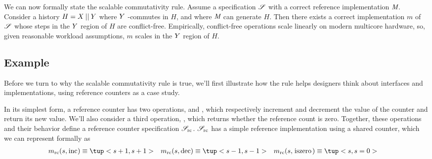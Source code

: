 We can now formally state the scalable commutativity rule.
%
Assume a specification $\mathscr{S}$ with a correct reference implementation
$\textit{M}$.
%
Consider a history $H = X \mathbin{||} Y$ where $Y$ \SIM-commutes in $H$,
and where $\textit{M}$ can generate $H$.
%
Then there exists a correct implementation $m$ of $\mathscr{S}$ whose steps in
the $Y$ region of $H$ are conflict-free.
%
Empirically, conflict-free operations scale linearly on modern
multicore hardware, so, given reasonable workload assumptions,
$m$ scales in the $Y$ region of $H$.





\subsection{Example}
\label{sec:rule:rc-example}

Before we turn to why the scalable commutativity rule is true, we'll
first illustrate how the rule helps designers think about interfaces
and implementations, using reference counters as a case study.

In its simplest form, a reference counter has two operations,
 and , which respectively increment and decrement
the value of the counter and return its new value.  We'll also
consider a third operation, , which returns whether the
reference count is zero.  Together, these operations and their
behavior define a reference counter specification $\mathscr{S}_{\text{rc}}$.
$\mathscr{S}_{\text{rc}}$ has a simple reference implementation using a shared
counter, which we can represent formally as
%
\begin{align*}
  \MRC(s, \code{inc}) & \equiv \tup<s+1, s+1> &
  \MRC(s, \code{dec}) & \equiv \tup<s-1, s-1> &
  \MRC(s, \code{iszero}) & \equiv \tup<s, s = 0>
\end{align*}

